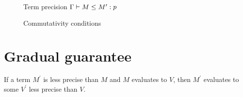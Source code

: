 \begin{figure}
\begin{prooftree}
\end{prooftree}
\begin{prooftree}
\end{prooftree}
\begin{prooftree}
\end{prooftree}
\begin{prooftree}
\end{prooftree}
\caption{Term precision $\TermP{\Gamma}{M}{M^\prime}{p}$}
\end{figure}

\begin{figure}
\begin{prooftree}
\end{prooftree}
\begin{prooftree}
\end{prooftree}
\begin{prooftree}
\end{prooftree}
\begin{prooftree}
\end{prooftree}
\caption{Commutativity conditions}
\end{figure}

\clearpage

\section{Gradual guarantee}

If a term $M^\prime$ is less precise than $M$ and $M$ evaluates to $V$,
then $M^\prime$ evaluates to some $V^\prime$ less precise than $V$.

